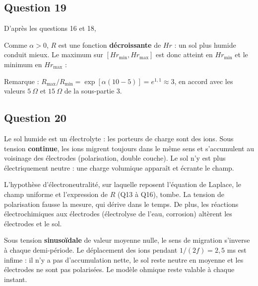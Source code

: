 \documentclass[11pt,a4paper]{article}
\newcommand{\equationajustee}[1]{%
  \sbox{\boiteequation}{$\displaystyle #1$}%
  \ifdim\wd\boiteequation>\linewidth
    \[\resizebox{\linewidth}{!}{\usebox{\boiteequation}}\]%
  \else
    \[#1\]%
  \fi}
\begin{document}
\hypertarget{question-19}{%
\subsection{Question 19}\label{question-19}}

D'après les questions 16 et 18,

\equationajustee{R(Hr)=\frac{c\,\rho_0}{ab}\exp\Big(\frac{\alpha}{Hr}+\beta\Big)}

Comme \(\alpha>0\), \(R\) est une fonction \textbf{décroissante} de \(Hr\) : un sol plus humide conduit mieux. Le maximum sur \([Hr_{\min},Hr_{\max}]\) est donc atteint en \(Hr_{\min}\) et le minimum en \(Hr_{\max}\) :

\equationajustee{\boxed{\begin{aligned}
R_{\min}&=\frac{c\,\rho_0}{ab}\exp\Big(\frac{\alpha}{Hr_{\max}}+\beta\Big)\\
R_{\max}&=\frac{c\,\rho_0}{ab}\exp\Big(\frac{\alpha}{Hr_{\min}}+\beta\Big)
\end{aligned}}}

Remarque : \(R_{\max}/R_{\min}=\exp[\alpha(10-5)]=e^{1{,}1}\approx3\), en accord avec les valeurs \(5\ \Omega\) et \(15\ \Omega\) de la sous-partie 3.

\hypertarget{question-20}{%
\subsection{Question 20}\label{question-20}}

Le sol humide est un électrolyte : les porteurs de charge sont des ions. Sous tension \textbf{continue}, les ions migrent toujours dans le même sens et s'accumulent au voisinage des électrodes (polarisation, double couche). Le sol n'y est plus électriquement neutre : une charge volumique apparaît et écrante le champ.

L'hypothèse d'électroneutralité, sur laquelle reposent l'équation de Laplace, le champ uniforme et l'expression de \(R\) (Q13 à Q16), tombe. La tension de polarisation fausse la mesure, qui dérive dans le temps. De plus, les réactions électrochimiques aux électrodes (électrolyse de l'eau, corrosion) altèrent les électrodes et le sol.

Sous tension \textbf{sinusoïdale} de valeur moyenne nulle, le sens de migration s'inverse à chaque demi-période. Le déplacement des ions pendant \(1/(2f)=2{,}5\) ms est infime : il n'y a pas d'accumulation nette, le sol reste neutre en moyenne et les électrodes ne sont pas polarisées. Le modèle ohmique reste valable à chaque instant.
\end{document}
